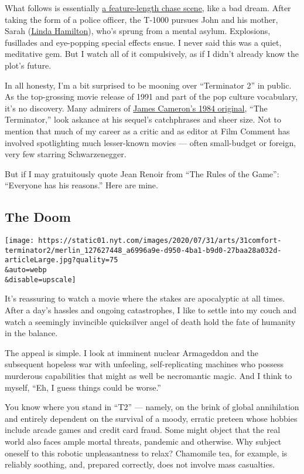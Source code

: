 What follows is essentially
\href{https://www.nytimes.com/2020/07/01/movies/movie-car-chase-scenes.html}{a
feature-length chase scene}, like a bad dream. After taking the form of
a police officer, the T-1000 pursues John and his mother, Sarah
(\href{https://www.nytimes.com/2019/09/03/movies/linda-hamilton-terminator.html}{Linda
Hamilton}), who's sprung from a mental asylum. Explosions, fusillades
and eye-popping special effects ensue. I never said this was a quiet,
meditative gem. But I watch all of it compulsively, as if I didn't
already know the plot's future.

In all honesty, I'm a bit surprised to be mooning over ``Terminator 2''
in public. As the top-grossing movie release of 1991 and part of the pop
culture vocabulary, it's no discovery. Many admirers of
\href{https://www.youtube.com/watch?v=QIcomuI1j7I}{James Cameron's 1984
original}, ``The Terminator,'' look askance at his sequel's catchphrases
and sheer size. Not to mention that much of my career as a critic and as
editor at Film Comment has involved spotlighting much lesser-known
movies --- often small-budget or foreign, very few starring
Schwarzenegger.

But if I may gratuitously quote Jean Renoir from ``The Rules of the
Game'': ``Everyone has his reasons.'' Here are mine.

\hypertarget{the-doom}{%
\subsection{The Doom}\label{the-doom}}

\texttt{[image: https://static01.nyt.com/images/2020/07/31/arts/31comfort-terminator2/merlin\_127627448\_a6996a9e-d950-4ba1-b9d0-27baa28a032d-articleLarge.jpg?quality=75\\\&auto=webp\\\&disable=upscale]}

It's reassuring to watch a movie where the stakes are apocalyptic at all
times. After a day's hassles and ongoing catastrophes, I like to settle
into my couch and watch a seemingly invincible quicksilver angel of
death hold the fate of humanity in the balance.

The appeal is simple. I look at imminent nuclear Armageddon and the
subsequent hopeless war with unfeeling, self-replicating machines who
possess murderous capabilities that might as well be necromantic magic.
And I think to myself, ``Eh, I guess things could be worse.''

You know where you stand in ``T2'' --- namely, on the brink of global
annihilation and entirely dependent on the survival of a moody, erratic
preteen whose hobbies include arcade games and credit card fraud. Some
might object that the real world also faces ample mortal threats,
pandemic and otherwise. Why subject oneself to this robotic
unpleasantness to relax? Chamomile tea, for example, is reliably
soothing, and, prepared correctly, does not involve mass casualties.

